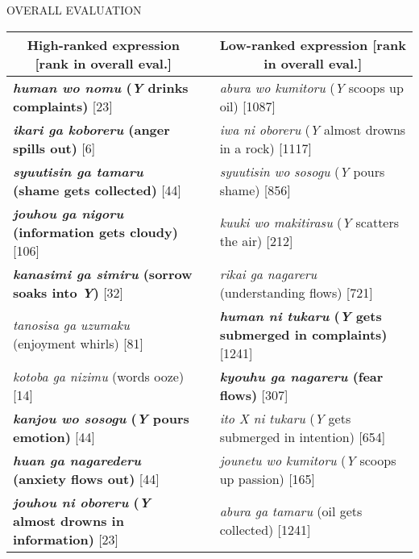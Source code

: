 \documentclass[unicode,20pt]{beamer}
\newcommand\header[1]{\multicolumn{1}{c}{\textbf{#1}}}
\newcommand\better[1]{\textcolor{sPink}{\textbf{#1}}}
\begin{document}
\begin{frame}
\begin{columns}[t]
\begin{column}{.47\textwidth}
\begin{block}{OVERALL EVALUATION}
                \begin{table}[t]
                    \centering\scriptsize
                    \begin{tabular}{lcl}
                        \toprule%
                        \header{High-ranked expression [rank in overall eval.]}
                        &
                        & \header{Low-ranked expression [rank in overall eval.]} \\
                        \midrule
                        \better{\emph{human wo nomu} (\emph{Y} drinks complaints)} [23]
                            &
                            & \emph{abura wo kumitoru} (\emph{Y} scoops up oil) [1087] \\
                        \better{\emph{ikari ga koboreru} (anger spills out)} [6]
                            &
                            & \emph{iwa ni oboreru} (\emph{Y} almost drowns in a rock) [1117] \\
                        \better{\emph{syuutisin ga tamaru} (shame gets collected)} [44]
                            &
                            & \emph{syuutisin wo sosogu} (\emph{Y} pours shame) [856] \\
                        \better{\emph{jouhou ga nigoru} (information gets cloudy)} [106]
                            &
                            & \emph{kuuki wo makitirasu} (\emph{Y} scatters the air) [212] \\
                        \better{\emph{kanasimi ga simiru} (sorrow soaks into \emph{Y})} [32]
                            &
                            & \emph{rikai ga nagareru} (understanding flows) [721] \\
                        \emph{tanosisa ga uzumaku} (enjoyment whirls) [81]
                            &
                            & \better{\tiny \emph{human ni tukaru} (\emph{Y} gets submerged in complaints)} [1241] \\
                        \emph{kotoba ga nizimu} (words ooze) [14]
                            &
                            & \better{\emph{kyouhu ga nagareru} (fear flows)} [307] \\
                        \better{\emph{kanjou wo sosogu} (\emph{Y} pours emotion)} [44]
                            &
                            & {\tiny \emph{ito X ni tukaru} (\emph{Y} gets submerged in intention) [654]} \\
                        \better{\emph{huan ga nagarederu} (anxiety flows out)} [44]
                            &
                           & \emph{jounetu wo kumitoru} (\emph{Y} scoops up passion) [165] \\
                        \better{\tiny \emph{jouhou ni oboreru} (\emph{Y} almost drowns in information)} [23]
                            &
                           & \emph{abura ga tamaru} (oil gets collected) [1241] \\
                        \bottomrule
                    \end{tabular}
                \end{table}


\end{block}
\end{column}
\end{columns}
\end{frame}
\end{document}
